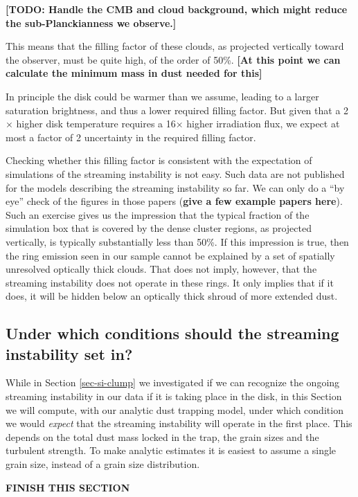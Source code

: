 \documentclass{aa}
\begin{document}
{\bf [TODO: Handle the CMB and cloud background, which might reduce the
sub-Planckianness we observe.]}

This means that the filling factor of these clouds, as projected vertically
toward the observer, must be quite high, of the order of 50\%. {\bf [At this
    point we can calculate the minimum mass in dust needed for this]}

In principle the disk could be warmer than we assume, leading to a larger
saturation brightness, and thus a lower required filling factor. But given that
a 2$\times$ higher disk temperature requires a 16$\times$ higher irradiation
flux, we expect at most a factor of 2 uncertainty in the required filling
factor.

Checking whether this filling factor is consistent with the expectation of
simulations of the streaming instability is not easy. Such data are not
published for the models describing the streaming instability so far.  We can
only do a ``by eye'' check of the figures in those papers ({\bf give a few
  example papers here}). Such an exercise gives us the impression that the
typical fraction of the simulation box that is covered by the dense cluster
regions, as projected vertically, is typically substantially less than 50\%. If
this impression is true, then the ring emission seen in our sample cannot be
explained by a set of spatially unresolved optically thick clouds. That does not
imply, however, that the streaming instability does not operate in these
rings. It only implies that if it does, it will be hidden below an optically
thick shroud of more extended dust.





\subsection{Under which conditions should the streaming instability set in?}
While in Section \ref{sec-si-clump} we investigated if we can recognize the
ongoing streaming instability in our data if it is taking place in the disk, in
this Section we will compute, with our analytic dust trapping model, under which
condition we would {\em expect} that the streaming instability will operate in
the first place. This depends on the total dust mass locked in the trap, the
grain sizes and the turbulent strength. To make analytic estimates it is easiest
to assume a single grain size, instead of a grain size distribution.

{\bf FINISH THIS SECTION}
\end{document}
